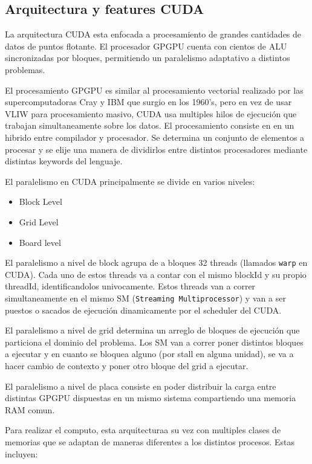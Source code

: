 \subsection{Arquitectura y features CUDA}

La arquitectura CUDA esta enfocada a procesamiento de grandes cantidades de datos
de puntos flotante. El procesador GPGPU cuenta con cientos de ALU sincronizadas
por bloques, permitiendo un paralelismo adaptativo a distintos problemas.

El procesamiento GPGPU es similar al procesamiento vectorial
realizado por las supercomputadoras Cray y IBM que surgio en los 1960's, pero
en vez de usar VLIW para procesamiento masivo, CUDA usa multiples hilos de ejecuci\'on
que trabajan simultaneamente sobre los datos.
El procesamiento consiste en en un hibrido entre compilador y procesador. Se determina
un conjunto de elementos a procesar y se elije una manera de dividirlos entre distintos
procesadores mediante distintas keywords del lenguaje.

El paralelismo en CUDA principalmente se divide en varios niveles:
\begin{itemize}
  \item Block Level
  \item Grid Level
  \item Board level
\end{itemize}

El paralelismo a nivel de block agrupa de a bloques 32 threads (llamados \texttt{warp} en CUDA).
Cada uno de estos threads va a contar con el mismo blockId y su propio threadId, identificandolos univocamente.
Estos threads van a correr simultaneamente en el mismo SM (\texttt{Streaming Multiprocessor}) y
van a ser puestos o sacados de ejecuci\'on dinamicamente por el scheduler del CUDA.

El paralelismo a nivel de grid determina un arreglo de bloques de ejecuci\'on que particiona
el dominio del problema. Los SM van a correr poner distintos bloques a ejecutar y en cuanto
se bloquea alguno (por stall en alguna unidad), se va a hacer cambio de contexto y poner
otro bloque del grid a ejecutar.

El paralelismo a nivel de placa consiste en poder distribuir la carga entre distintas
GPGPU dispuestas en un mismo sistema compartiendo una memoria RAM comun.

Para realizar el computo, esta arquitecturaa su vez con multiples clases de memorias
que se adaptan de maneras diferentes a los distintos procesos. Estas incluyen:

